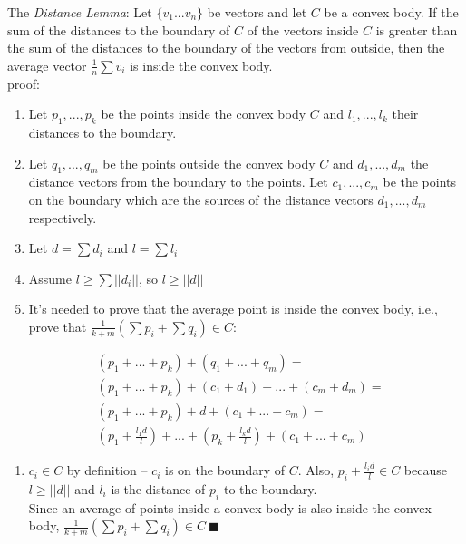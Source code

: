 \documentclass[10pt, conference]{IEEEtran}
\newcommand{\distanceLemma}{\textit{Distance Lemma}}
\begin{document}
The \distanceLemma : Let ${\{v_1 ... v_n\}}$ be vectors and let $C$ be a convex body. If the sum of the distances to the boundary of $C$ of the vectors inside $C$ is greater than the sum of the distances to the boundary of the vectors from outside, then the average vector ${\frac{1}{n}\sum {v_i}}$ is inside the convex body. \\
proof: \\
\begin{enumerate}
\item Let ${p_1 ,..., p_k}$ be the points inside the convex body $C$ and ${l_1 ,..., l_k}$ their distances to the boundary.
\item Let ${q_1 ,..., q_m}$ be the points outside the convex body $C$ and ${d_1 ,..., d_m}$ the distance vectors from the boundary to the points. Let ${c_1 ,..., c_m}$ be the points on the boundary which are the sources of the distance vectors ${d_1 ,..., d_m}$ respectively.
\item Let ${d = \sum {d_i}}$ and ${l = \sum {l_i}}$
\item Assume $l \geq \sum ||d_i||$, so $l \geq ||d||$
\item It's needed to prove that the average point is inside the convex body, i.e., prove that ${\frac{1}{k+m}(\sum{p_i} + \sum{q_i}) \in C}$:
\end{enumerate}
\begin{equation}
\begin{aligned}
&( p_1+...+p_k) + (q_1+...+q_m) = \\
&( p_1+...+p_k) + (c_1+d_1) + ... + (c_m + d_m) = \\
&( p_1+...+p_k) + d + (c_1 + ... + c_m) = \\
&\left( p_1 + \frac{l_1 d}{l}\right) + ... + \left(p_k + \frac{l_k d}{l}\right) + (c_1 + ... + c_m)
\end{aligned}
\end{equation}
\begin{enumerate}
\item[\ \ \ ] ${c_i \in C}$ by definition -- $c_i$ is on the boundary of $C$. Also, ${p_i + \frac{l_i d}{l} \in C}$ because ${l \geq ||d||}$ and $l_i$ is the distance of $p_i$ to the boundary. \\
Since an average of points inside a convex body is also inside the convex body, ${\frac{1}{k+m}(\sum{p_i} + \sum{q_i}) \in C \ \blacksquare} $ 
\end{enumerate}
\end{document}
